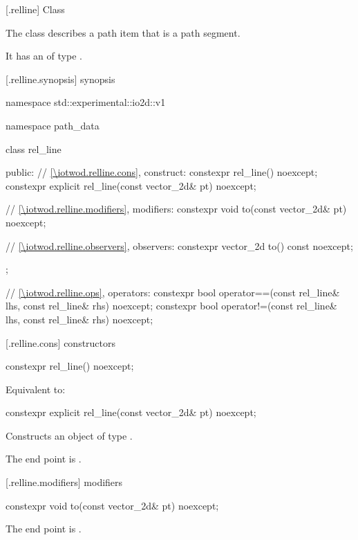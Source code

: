  [\iotwod.relline] {Class }

\pnum
{}%
The class  describes a path item that is a path segment.

\pnum
It has an  of type .

 [\iotwod.relline.synopsis] { synopsis}

\begin{codeblock}
namespace std::experimental::io2d::v1 {
  namespace path_data {
    class rel_line {
    public:
      // \ref{\iotwod.relline.cons}, construct:
      constexpr rel_line() noexcept;
      constexpr explicit rel_line(const vector_2d& pt) noexcept;

      // \ref{\iotwod.relline.modifiers}, modifiers:
      constexpr void to(const vector_2d& pt) noexcept;

      // \ref{\iotwod.relline.observers}, observers:
      constexpr vector_2d to() const noexcept;
    };
    
    // \ref{\iotwod.relline.ops}, operators:
    constexpr bool operator==(const rel_line& lhs, const rel_line& rhs) 
      noexcept;
    constexpr bool operator!=(const rel_line& lhs, const rel_line& rhs) 
      noexcept;
  }
}
\end{codeblock}

 [\iotwod.relline.cons] { constructors}

%
\begin{itemdecl}
constexpr rel_line() noexcept;
\end{itemdecl}
\begin{itemdescr}
\pnum
\effects
Equivalent to: 
\end{itemdescr}

%
\begin{itemdecl}
constexpr explicit rel_line(const vector_2d& pt) noexcept;
\end{itemdecl}
\begin{itemdescr}
\pnum
\effects
Constructs an object of type .

\pnum
The end point is .
\end{itemdescr}

 [\iotwod.relline.modifiers]{ modifiers}

\begin{itemdecl}
constexpr void to(const vector_2d& pt) noexcept;
\end{itemdecl}
\begin{itemdescr}
\pnum
\effects
The end point is .
\end{itemdescr}

